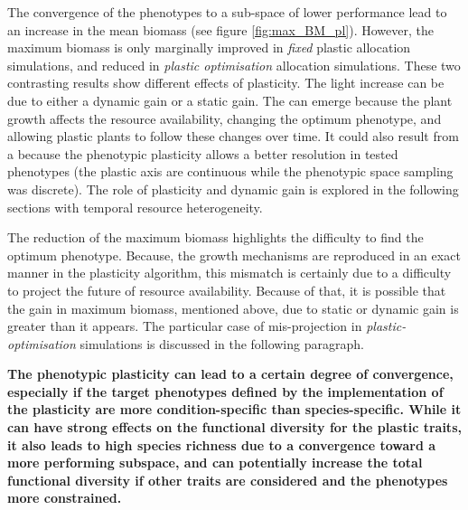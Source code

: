 The convergence of the phenotypes to a sub-space of lower performance lead to an increase in the mean biomass (see figure \ref{fig:max_BM_pl}). However, the maximum biomass is only marginally improved in \textit{fixed} plastic allocation simulations, and reduced in \textit{plastic optimisation} allocation simulations. These two contrasting results show different effects of plasticity. The light increase can be due to either a dynamic gain or a static gain. The  can emerge because the plant growth affects the resource availability, changing the optimum phenotype, and allowing plastic plants to follow these changes over time. It could also result from a  because the phenotypic plasticity allows a better resolution in tested phenotypes (the plastic axis are continuous while the phenotypic space sampling was discrete). The role of plasticity and dynamic gain is explored in the following sections with temporal resource heterogeneity.

The reduction of the maximum biomass highlights the difficulty to find the optimum phenotype. Because, the growth mechanisms are reproduced in an exact manner in the plasticity algorithm, this mismatch is certainly due to a difficulty to project the future of resource availability. Because of that, it is possible that the gain in maximum biomass, mentioned above, due to static or dynamic gain is greater than it appears. The particular case of mis-projection in \textit{plastic-optimisation} simulations is discussed in the following paragraph. 

\textbf{The phenotypic plasticity can lead to a certain degree of convergence, especially if the target phenotypes defined by the implementation of the plasticity are more condition-specific than species-specific. While it can have strong effects on the functional diversity for the plastic traits, it also leads to high species richness due to a convergence toward a more performing subspace, and can potentially increase the total functional diversity if other traits are considered and the phenotypes more constrained. }



